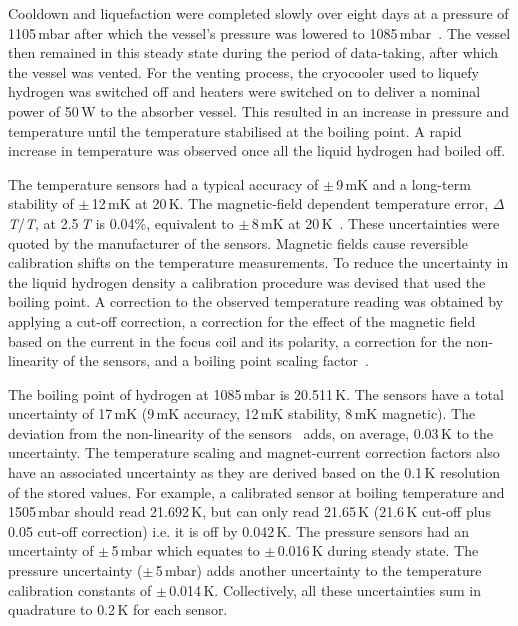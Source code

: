 Cooldown and liquefaction were completed slowly over eight days at a
pressure of 1105\,mbar after which the vessel's pressure was lowered to
1085\,mbar~\cite{1748-0221-13-09-T09008}.
The vessel then remained in this steady state during the period of data-taking, after which the vessel was vented. For the venting process,
the cryocooler used to liquefy hydrogen was
switched off and heaters were switched on to deliver a nominal power
of 50\,W to the absorber vessel.
This resulted in an increase in pressure and temperature until the
temperature stabilised at the boiling point.
A rapid increase in temperature was observed once all the
liquid hydrogen had boiled off. 

The temperature sensors had a typical accuracy of
$\mathrm{\pm}$\,9\,mK and a long-term stability of
$\mathrm{\pm}$\,12\,mK at 20\,K.
The magnetic-field dependent temperature error, $\Delta$\textit{T}/\textit{T}, at 2.5\,\textit{T} is 0.04\%,
equivalent to $\mathrm{\pm}$\,8\,mK at
20\,K~\cite{TemperatureMeasurement}.
These uncertainties were quoted by the manufacturer of the sensors.
Magnetic fields cause reversible calibration shifts on the temperature
measurements.
To reduce the uncertainty in the liquid hydrogen density a calibration
procedure was devised that used the boiling point.
A correction to the observed temperature reading was obtained by
applying a cut-off correction, a correction for the effect of the
magnetic field based on the current in the focus coil and its
polarity, a correction for the non-linearity of the sensors, and a 
boiling point scaling factor~\cite{NOTE524}.  
 
The boiling point of hydrogen at 1085\,mbar is 20.511\,K.
The sensors have a total uncertainty of 17\,mK (9\,mK accuracy, 12\,mK
stability, 8\,mK magnetic).
The deviation from the non-linearity of the sensors~\cite{TemperatureMeasurement} adds, on average,
0.03\,K to the uncertainty.
The temperature scaling and magnet-current correction factors also
have an associated uncertainty as they are derived based on the 0.1\,K resolution of the stored values.
For example, a calibrated sensor at boiling temperature and 1505\,mbar
should read 21.692\,K, but can only read 21.65\,K (21.6\,K cut-off
plus 0.05 cut-off correction) i.e. it is off by 0.042\,K.
The pressure sensors had an uncertainty of $\mathrm{\pm}$\,5\,mbar
which equates to $\mathrm{\pm}$\,0.016\,K during steady state.
The pressure uncertainty ($\mathrm{\pm}$\,5\,mbar) adds another
uncertainty to the temperature calibration constants of
$\mathrm{\pm}$\,0.014\,K.
Collectively, all these uncertainties sum in quadrature to 0.2\,K for
each sensor.
 
